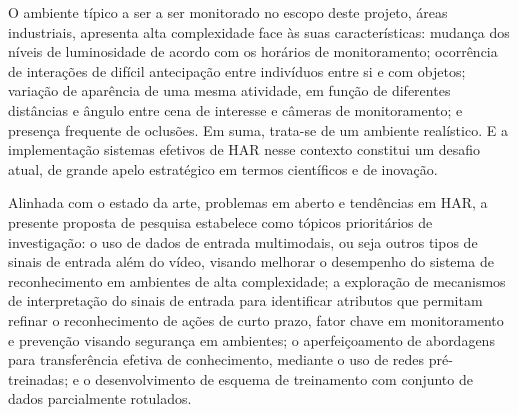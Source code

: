 O ambiente típico a ser a ser monitorado no escopo deste projeto, áreas industriais, apresenta alta complexidade face às suas características: mudança dos níveis de luminosidade de acordo com os horários de monitoramento; ocorrência de interações de difícil antecipação entre indivíduos entre si e com objetos; variação de aparência de uma mesma atividade, em função de diferentes distâncias e ângulo entre cena de interesse e câmeras de monitoramento; e presença frequente de oclusões. Em suma, trata-se de um ambiente realístico. E a implementação sistemas efetivos de HAR nesse contexto constitui um desafio atual, de grande apelo estratégico em termos científicos e de inovação.
%
%

Alinhada com o estado da arte, problemas em aberto e tendências em HAR, a presente proposta de pesquisa estabelece como tópicos prioritários de investigação: o uso de dados de entrada  multimodais, ou seja outros tipos de sinais de entrada além do vídeo, visando melhorar o desempenho do sistema de reconhecimento em ambientes de alta complexidade; a exploração de mecanismos de interpretação do sinais de entrada para identificar atributos que permitam refinar o reconhecimento de ações de curto prazo, fator chave em monitoramento e prevenção visando segurança em ambientes; o aperfeiçoamento de abordagens para transferência efetiva de conhecimento, mediante o uso de redes pré-treinadas; e o desenvolvimento de esquema de treinamento com conjunto de dados parcialmente rotulados.
